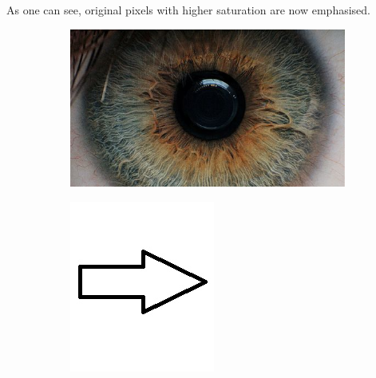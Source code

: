 \documentclass{article}
\begin{document}
As one can see, original pixels with higher saturation are now emphasised.
\begin{figure}[H]
\centering
\begin{subfigure}{.47\textwidth}
  \centering
  \includegraphics[width=0.97\linewidth]{_Figures/raw_data_1.jpg}
  \caption{}
  \label{fig:raw_1}
\end{subfigure}%
\begin{subfigure}{.09\textwidth}
  \centering
  \includegraphics[width=0.97\linewidth]{_Figures/leftrightarrow.jpg}

\end{subfigure}
\end{figure}
\end{document}
